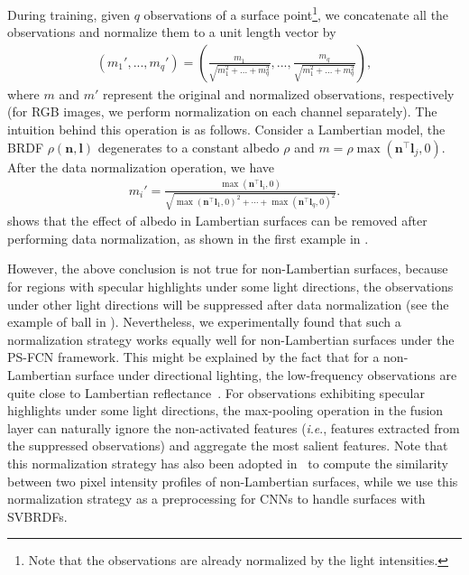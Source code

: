 \documentclass[10pt,journal,compsoc]{IEEEtran}
\newcommand{\ie}{\textit{i}.\textit{e}.}
\newcommand{\vn}{\boldsymbol{n}}
\newcommand{\vl}{\boldsymbol{l}}
\begin{document}
During training, given $q$ observations of a surface point\footnote{Note that the observations are already normalized by the light intensities.}, we concatenate all the observations and normalize them to a unit length vector by
\begin{align}
    \label{eq:normalize}
    \left(m_1', ..., m_{q}'\right) = \left(\frac{m_1}{\sqrt{m_1^2+...+m_{q}^2}}, ..., \frac{m_{q}}{\sqrt{m_1^2+...+m_{q}^2}}\right),
\end{align}
where $m$ and $m'$ represent the original and normalized observations, respectively (for RGB images, we perform normalization on each channel separately). 
The intuition behind this operation is as follows. Consider a Lambertian model, the BRDF $\rho(\vn, \vl)$ degenerates to a constant albedo $\rho$ and $m = \rho \max(\vn^\top \vl_j, 0)$. 
After the data normalization operation, we have
\begin{align}
    \label{eq:normalize2}
    m_{i}' = \frac{\max(\vn^\top \vl_i, 0)}{\sqrt{\max(\vn^\top \vl_1, 0)^2 + \cdots + \max(\vn^\top \vl_q, 0)^2}}.
\end{align}
 shows that the effect of albedo in Lambertian surfaces can be removed after performing data normalization, as shown in the first example in .

However, the above conclusion is not true for non-Lambertian surfaces, because for regions with specular highlights under some light directions, the observations under other light directions will be suppressed after data normalization (see the example of {\sc ball} in ).
Nevertheless, we experimentally found that such a normalization strategy works equally well for non-Lambertian surfaces under the PS-FCN framework.
This might be explained by the fact that for a non-Lambertian surface under directional lighting, the low-frequency observations are quite close to Lambertian reflectance~\cite{shi2014bi}.
For observations exhibiting specular highlights under some light directions, the max-pooling operation in the fusion layer can naturally ignore the non-activated features (\ie, features extracted from the suppressed observations) and aggregate the most salient features.  
Note that this normalization strategy has also been adopted in~\cite{sato2007shape,lu2013uncalibrated} to compute the similarity between two pixel intensity profiles of non-Lambertian surfaces, while we use this normalization strategy as a preprocessing for CNNs to handle surfaces with SVBRDFs.  
\end{document}
